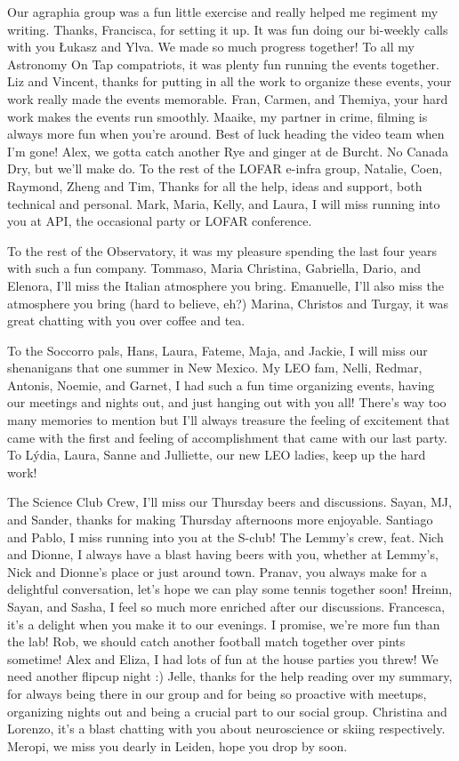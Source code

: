 \begin{thesisacknowledgements}
\begin{changemargin}{-0.3cm}{-0.3cm}
{   Our agraphia group was a fun little exercise and really helped me regiment my writing. Thanks, Francisca, for setting it up. It was fun doing our bi-weekly calls with you \L{}ukasz and Ylva. We made so much progress together! To all my Astronomy On Tap compatriots, it was plenty fun running the events together. Liz and Vincent, thanks for putting in all the work to organize these events, your work really made the events memorable. Fran, Carmen,  and Themiya, your hard work makes the events run smoothly. Maaike, my partner in crime, filming is always more fun when you're around. Best of luck heading the video team when I'm gone! Alex, we gotta catch another Rye and ginger at de Burcht. No Canada Dry, but we'll make do. To the rest of the LOFAR e-infra group, Natalie, Coen, Raymond, Zheng and Tim, Thanks for all the help, ideas and support, both technical and personal. Mark, Maria, Kelly, and Laura, I will miss running into you at API, the occasional party or LOFAR conference. 

    To the rest of the Observatory, it was my pleasure spending the last four years with such a fun company. Tommaso, Maria Christina, Gabriella, Dario, and Elenora, I'll miss the Italian atmosphere you bring. Emanuelle, I'll also miss the atmosphere you bring (hard to believe, eh?) Marina, Christos and Turgay, it was great chatting with you over coffee and tea. 

    To the Soccorro pals, Hans, Laura, Fateme, Maja, and Jackie, I will miss our shenanigans that one summer in New Mexico. My LEO fam, Nelli, Redmar, Antonis, Noemie, and Garnet, I had such a fun time organizing events, having our meetings and nights out, and just hanging out with you all! There's way too many memories to mention but I'll always treasure the feeling of excitement that came with the first and feeling of accomplishment that came with our last party. To  L\'ydia, Laura, Sanne and Julliette, our new LEO ladies, keep up the hard work!

    The Science Club Crew, I'll miss our Thursday beers and discussions. Sayan, MJ, and Sander, thanks for making Thursday afternoons more enjoyable. Santiago and Pablo, I miss running into you at the S-club! The Lemmy's crew, feat. Nich and Dionne, I always have a blast having beers with you, whether at Lemmy's, Nick and Dionne's place or just around town. Pranav, you always make for a delightful conversation, let's hope we can play some tennis together soon! Hreinn, Sayan, and Sasha, I feel so much more enriched after our discussions. Francesca, it's a delight when you make it to our evenings. I promise, we're more fun than the lab! Rob, we should catch another football match together over pints sometime! Alex and Eliza, I had lots of fun at the house parties you threw! We need another flipcup night :) Jelle, thanks for the help reading over my summary, for always being there in our group and for being so proactive with meetups, organizing nights out and being a crucial part to our social group. Christina and Lorenzo, it's a blast chatting with you about neuroscience or skiing respectively. Meropi, we miss you dearly in Leiden, hope you drop by soon. 

}
\end{changemargin}
\end{thesisacknowledgements}
